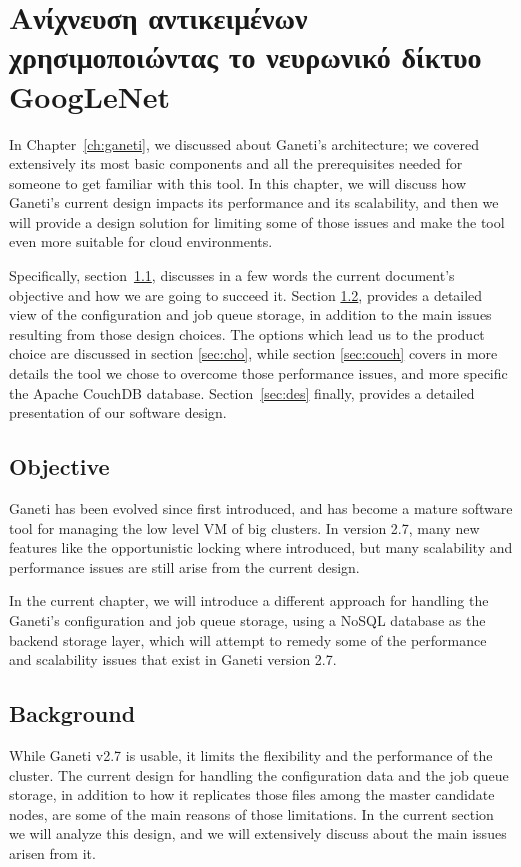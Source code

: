 \chapter{Ανίχνευση αντικειμένων χρησιμοποιώντας το νευρωνικό δίκτυο GoogLeNet}\label{ch:googlenet}

In Chapter~\ref{ch:ganeti}, we discussed about Ganeti's architecture; we covered
extensively its most basic components and all the prerequisites needed for
someone to get familiar with this tool. In this chapter, we will discuss how
Ganeti's current design impacts its performance and its scalability, and
then we will provide a design solution for limiting some of those issues and make
the tool even more suitable for cloud environments.

Specifically, section~\ref{sec:obj}, discusses in a few words the current
document's objective and how we are going to succeed it. Section
\ref{sec:back}, provides a detailed view of the configuration and job queue
storage, in addition to the main issues resulting from those design choices. The
options which lead us to the product choice are discussed in section
\ref{sec:cho}, while section \ref{sec:couch} covers in more details the tool
we chose to overcome those performance issues, and more specific the Apache
CouchDB database. Section~\ref{sec:des} finally, provides a detailed
presentation of our software design.

\section{Objective}\label{sec:obj}

Ganeti has been evolved since first introduced, and has become a mature software
tool for managing the low level VM of big clusters. In version 2.7, many new
features like the opportunistic locking where introduced, but many scalability
and performance issues are still arise from the current design.

In the current chapter, we will introduce a different approach for handling the
Ganeti's configuration and job queue storage, using a NoSQL database as the
backend storage layer, which will attempt to remedy some of the performance and
scalability issues that exist in Ganeti version 2.7.

\section{Background}\label{sec:back}

While Ganeti v2.7 is usable, it limits the flexibility and the performance of
the cluster. The current design for handling the configuration data and the job
queue storage, in addition to how it replicates those files among the master
candidate nodes, are some of the main reasons of those limitations. In the
current section we will analyze this design, and we will extensively discuss
about the main issues arisen from it.

